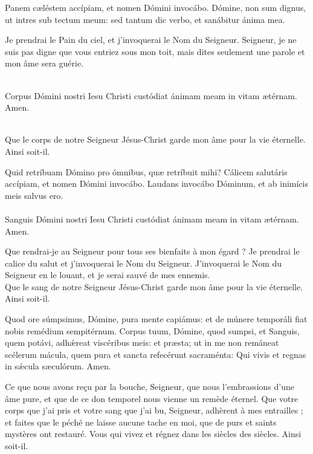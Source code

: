 \documentclass[twoside]{article}
\begin{document}
\begin{paracol}{2}
\switchcolumn*

Panem cæléstem accípiam, et nomen Dómini invocábo.
Dómine, non sum dignus, ut intres sub tectum meum: sed tantum dic verbo, et sanábitur ánima mea.

\switchcolumn

Je prendrai le Pain du ciel, et j’invoquerai le Nom du Seigneur.
Seigneur, je ne suis pas digne que vous entriez sous mon toit, mais dites seulement une parole et mon âme sera guérie.

\switchcolumn*

\\
Corpus Dómini nostri Iesu Christi custódiat ánimam meam in vitam ætérnam. Amen.

\switchcolumn

~\\
Que le corps de notre Seigneur Jésus-Christ garde mon âme pour la vie éternelle. Ainsi soit-il.

\switchcolumn*

Quid retríbuam Dómino pro ómnibus, quæ retríbuit mihi? Cálicem salutáris accípiam, et nomen Dómini invocábo. Laudans invocábo Dóminum, et ab inimícis meis salvus ero.\\
\\
Sanguis Dómini nostri Iesu Christi custódiat ánimam meam in vitam ætérnam. Amen.

\switchcolumn

Que rendrai-je au Seigneur pour tous ses bienfaits à mon égard ? Je prendrai le calice du salut et j’invoquerai le Nom du Seigneur. J’invoquerai le Nom du Seigneur en le louant, et je serai sauvé de mes ennemis.
~\\
Que le sang de notre Seigneur Jésus-Christ garde mon âme pour la vie éternelle. Ainsi soit-il.

\switchcolumn*

Quod ore súmpsimus, Dómine, pura mente capiámus: et de múnere temporáli fiat nobis remédium sempitérnum.
Corpus tuum, Dómine, quod sumpsi, et Sanguis, quem potávi, adhǽreat viscéribus meis: et præsta; ut in me non remáneat scélerum mácula, quem pura et sancta refecérunt sacraménta: Qui vivis et regnas in sǽcula sæculórum. Amen.

\switchcolumn

Ce que nous avons reçu par la bouche, Seigneur, que nous l’embrassions d’une âme pure, et que de ce don temporel nous vienne un remède éternel.
Que votre corps que j’ai pris et votre sang que j’ai bu, Seigneur, adhèrent à mes entrailles ; et faites que le péché ne laisse aucune tache en moi, que de purs et saints mystères ont restauré. Vous qui vivez et régnez dans les siècles des siècles. Ainsi soit-il.


\end{paracol}
\end{document}
